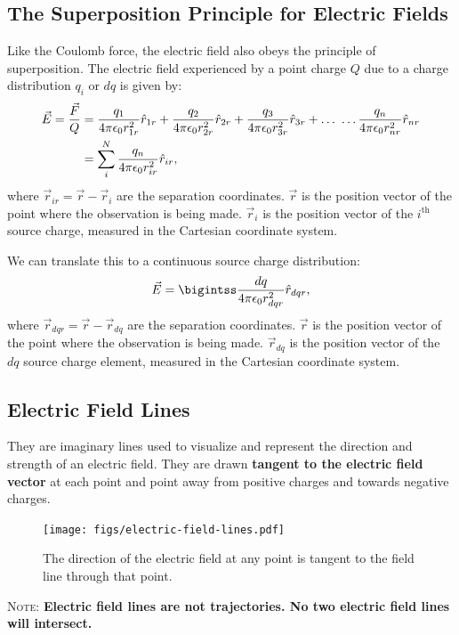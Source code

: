 \documentclass[12pt,b4paper]{article}
\begin{document}
\subsection*{The Superposition Principle for Electric Fields}
Like the Coulomb force, the electric field also obeys the principle of superposition. The electric field experienced by a point charge $Q$ due to a charge distribution $q_i$ or $dq$ is given by:
\begin{align}
    \vec{E}=\frac{\vec{F}}{Q}&=\frac{q_1}{4\pi\epsilon_0r_{1r}^2}\hat{r}_{1r}+\frac{q_2}{4\pi\epsilon_0r_{2r}^2}\hat{r}_{2r}+\frac{q_3}{4\pi\epsilon_0r_{3r}^2}\hat{r}_{3r}+\ldots\,\,\ldots\frac{q_n}{4\pi\epsilon_0r_{nr}^2}\hat{r}_{nr}\notag\\
    &=\sum_i^N\frac{q_n}{4\pi\epsilon_0r_{ir}^2}\hat{r}_{ir},
\end{align}
where $\vec{r}_{ir}=\vec{r}-\vec{r}_i$ are the separation coordinates. $\vec{r}$ is the position vector of the point where the observation is being made. $\vec{r}_i$ is the position vector of the $i^{\text{th}}$ source charge, measured in the Cartesian coordinate system.

We can translate this to a continuous source charge distribution:
\begin{align}
    \vec{E}=\bigintss\frac{dq}{4\pi\epsilon_0r_{dqr}^2}\hat{r}_{dqr},
\end{align}
where $\vec{r}_{dqr}=\vec{r}-\vec{r}_{dq}$ are the separation coordinates. $\vec{r}$ is the position vector of the point where the observation is being made. $\vec{r}_{dq}$ is the position vector of the $dq$ source charge element, measured in the Cartesian coordinate system.
\subsection{Electric Field Lines}
They are imaginary lines used to visualize and represent the direction and strength of an electric field. They are drawn \textbf{tangent to the electric field vector} at each point and point away from positive charges and towards negative charges. 
\begin{figure}[H]
    \centering
    \texttt{[image: figs/electric-field-lines.pdf]}
    \caption{The direction of the electric field at any point is tangent to the field line through that point.}
    \label{fig:electric-field-lines}
\end{figure}
\textsc{Note}: \textbf{Electric field lines are not trajectories. No two electric field lines will intersect.}
\end{document}
